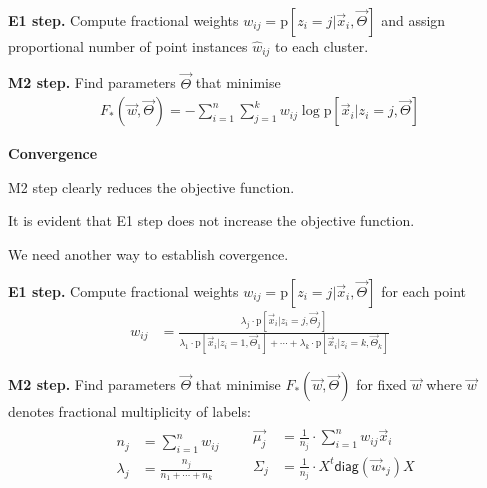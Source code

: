 \documentclass[landscape,footrule]{foils}
\newcommand\redsout{\bgroup\markoverwith{\textcolor{red}{\rule[0.3ex]{2pt}{4.0pt}}}\ULon}
\newcommand{\pd}[1]{\mathrm{p}[#1]}
\begin{document}

\textbf{E1 step.} Compute fractional weights $w_{ij}=\pd{z_i=j|\vec{x}_i,\vec{\Theta}}$ and assign proportional number of point instances $\hat{w}_{ij}$ to each cluster.  

\textbf{M2 step.} Find parameters $\vec{\Theta}$ that minimise 
\begin{align*}
F_*(\vec{w},\vec{\Theta}) =-\sum_{i=1}^n\sum_{j=1}^k w_{ij} \log\pd{\vec{x}_i|z_i=j,\vec{\Theta}}
\end{align*}


\textbf{Convergence}
\begin{triangles}
\item M2 step clearly reduces the objective function.
\item It is \redsout{not} evident that E1 step does not increase the objective function. 
\item We need another way to establish covergence. 
\end{triangles}

\enlargethispage{1cm}

\textbf{E1 step.} Compute fractional weights $w_{ij}=\pd{z_i=j|\vec{x}_i,\vec{\Theta}}$ for each point
\begin{align*}
w_{ij}&=\frac{\lambda_j\cdot\pd{\vec{x}_i|z_i=j,\vec{\Theta}_j}}{\lambda_1\cdot\pd{\vec{x}_i|z_i=1,\vec{\Theta}_1}+\cdots+\lambda_k\cdot\pd{\vec{x}_i|z_i=k,\vec{\Theta}_k}}
\end{align*}
\vspace*{0.5cm}  



\textbf{M2 step.} Find parameters $\vec{\Theta}$ that minimise $F_*(\vec{w},\vec{\Theta})$ for fixed $\vec{w}$ where $\vec{w}$ denotes fractional multiplicity of labels:
\begin{align*}
&\begin{aligned}
n_j&=\sum_{i=1}^n w_{ij}\\
\lambda_j&= \frac{n_j}{n_1+\cdots+n_k}
\end{aligned}
&&\begin{aligned}
\vec{\mu_{j}}&=\frac{1}{n_j}\cdot\sum_{i=1}^n w_{ij}\vec{x}_{i}\\
\Sigma_{j}&=\frac{1}{n_j}\cdot X^t \mathsf{diag}(\vec{w}_{*j})X\\
\end{aligned}
\end{align*}
\vspace*{-0.5cm}  
\end{document}
